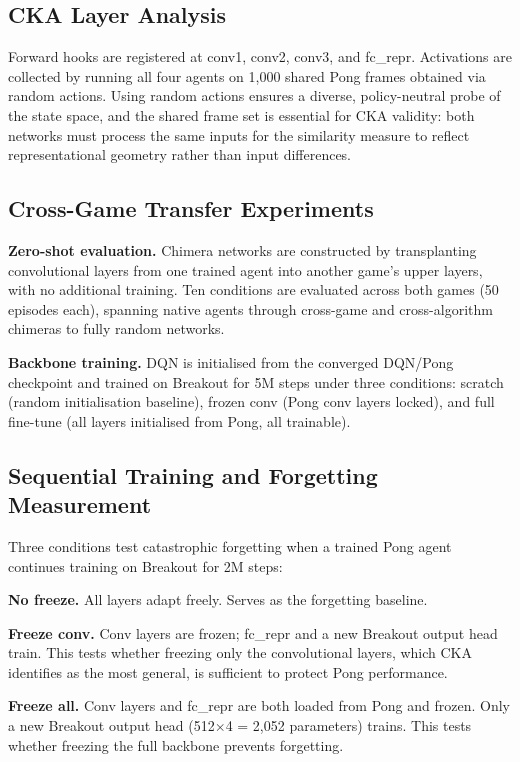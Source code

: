 \documentclass[a4paper]{article}
\begin{document}
\subsection{CKA Layer Analysis}

Forward hooks are registered at conv1, conv2, conv3, and fc\_repr. Activations are collected
by running all four agents on 1,000 shared Pong frames obtained via random actions. Using
random actions ensures a diverse, policy-neutral probe of the state space, and the shared
frame set is essential for CKA validity: both networks must process the same inputs for the
similarity measure to reflect representational geometry rather than input differences.

\subsection{Cross-Game Transfer Experiments}

\textbf{Zero-shot evaluation.} Chimera networks are constructed by transplanting
convolutional layers from one trained agent into another game's upper layers, with no
additional training. Ten conditions are evaluated across both games (50 episodes each),
spanning native agents through cross-game and cross-algorithm chimeras to fully random
networks.

\textbf{Backbone training.} DQN is initialised from the converged DQN/Pong checkpoint and
trained on Breakout for 5M steps under three conditions: scratch (random initialisation
baseline), frozen conv (Pong conv layers locked), and full fine-tune (all layers initialised
from Pong, all trainable).

\subsection{Sequential Training and Forgetting Measurement}

Three conditions test catastrophic forgetting when a trained Pong agent continues training
on Breakout for 2M steps:

\textbf{No freeze.} All layers adapt freely. Serves as the forgetting baseline.

\textbf{Freeze conv.} Conv layers are frozen; fc\_repr and a new Breakout output head train.
This tests whether freezing only the convolutional layers, which CKA identifies as the most
general, is sufficient to protect Pong performance.

\textbf{Freeze all.} Conv layers and fc\_repr are both loaded from Pong and frozen. Only a
new Breakout output head (512$\times$4 = 2,052 parameters) trains. This tests whether
freezing the full backbone prevents forgetting.
\end{document}
